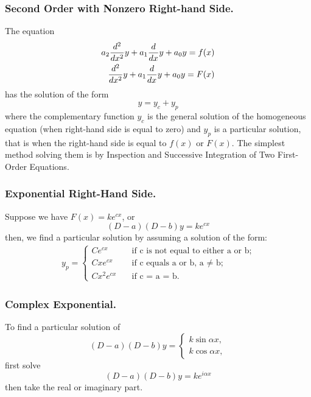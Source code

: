 \documentclass[../main.tex]{subfiles}
\begin{document}
\subsubsection*{Second Order with Nonzero Right-hand Side.} The equation
\begin{align*}
    a_2\frac{d^2}{dx^2} y+a_1\frac{d}{dx} y+a_0y=f(x)\\
    \frac{d^2}{dx^2} y+a_1\frac{d}{dx} y+a_0y=F(x)
\end{align*}
has the solution of the form
\begin{equation*}
    y = y_c + y_p
\end{equation*}
where the complementary function $y_c$ is the general solution of the homogeneous
equation (when right-hand side is equal to zero) and $y_p$ is a particular solution, that is when the right-hand side is equal to $f(x)$ or $F(x)$.  The simplest method solving them is by Inspection and Successive Integration of Two First-Order Equations.

\subsubsection*{Exponential Right-Hand Side.} 
Suppose we have $F (x) = ke^{cx}$, or
\begin{equation*}
    (D - a)(D - b)y =ke^{cx}
\end{equation*}
then, we find a particular solution by
assuming a solution of the form:
\begin{align*}
    y_p=
    \begin{cases}
        Ce^{cx} \quad&\text{if c is not equal to either a or b;}\\
        Cxe^{cx} \quad&\text{if c equals a or b, a  $\neq$ b;}\\
        Cx^2e^{cx} \quad&\text{if c = a = b.}
    \end{cases}
\end{align*}

\subsubsection*{Complex Exponential.} To find a particular solution of
\begin{equation*}
    (D - a)(D - b)y=\begin{cases}
        k\sin \alpha x,\\
        k\cos \alpha x,
    \end{cases}
\end{equation*}
first solve
\begin{equation*}
    (D - a)(D - b)y=ke^{i\alpha x}
\end{equation*}
then take the real or imaginary part. 
\end{document}
